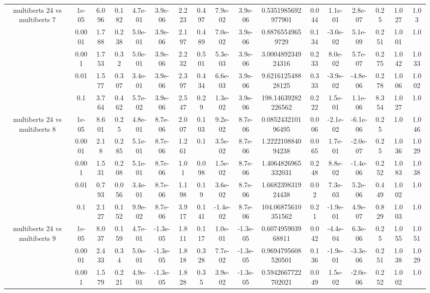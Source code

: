 \begin{tabular}{|c|c|c|c|c|c|c|c|c|c|c|c|c|c|c|c|c|}
\hline
\multirow{5}{*}{multiberts 24 vs multiberts 7} & 1e-05 & 6.096 & 0.182 & 4.7e-01 & 3.9e-06 & 2.223 & 0.497 & 7.9e-02 & 3.9e-06 & 0.5351985692977901 & 0.044 & 1.1e-01 & 2.8e-07 & 0.25 & 1.027 & 1.03 \\
 & 0.0001 & 1.788 & 0.238 & 5.0e-01 & 3.9e-06 & 2.197 & 0.489 & 7.0e-02 & 3.9e-06 & 0.88765549659729 & 0.134 & -3.0e-02 & 5.1e-09 & 0.251 & 1.001 & 1.0 \\
 & 0.001 & 1.753 & 0.32 & 5.0e-01 & 3.9e-06 & 2.232 & 0.501 & 5.3e-03 & 3.9e-06 & 3.000489234924316 & 0.233 & 8.0e-02 & 5.7e-07 & 0.275 & 1.042 & 1.033 \\
 & 0.01 & 1.577 & 0.307 & 3.4e-01 & 3.9e-06 & 2.397 & 0.434 & 6.6e-03 & 3.9e-06 & 9.621612548828125 & 0.333 & -3.9e-02 & -4.8e-06 & 0.278 & 1.006 & 1.002 \\
 & 0.1 & 3.764 & 0.462 & 5.7e-02 & 3.9e-06 & 2.547 & 0.29 & 1.3e-02 & 3.9e-06 & 198.14639282226562 & 0.222 & 1.5e-01 & 1.1e-06 & 8.354 & 1.027 & 1.0 \\
\hline
\multirow{5}{*}{multiberts 24 vs multiberts 8} & 1e-05 & 8.601 & 0.25 & 4.8e-01 & 8.7e-06 & 2.007 & 0.103 & 9.2e-02 & 8.7e-06 & 0.085243210196495 & 0.006 & -2.1e-02 & -6.1e-06 & 0.25 & 1.0 & 1.046 \\
 & 0.0001 & 2.18 & 0.285 & 5.1e-01 & 8.7e-06 & 1.261 & 0.1 & 3.5e-02 & 8.7e-06 & 1.222210884094238 & 0.065 & 1.7e-01 & -2.0e-07 & 0.25 & 1.036 & 1.029 \\
 & 0.001 & 1.531 & 0.208 & 5.1e-01 & 8.7e-06 & 1.01 & 0.098 & 1.5e-02 & 8.7e-06 & 1.4064826965332031 & 0.248 & 8.8e-02 & -1.4e-06 & 0.252 & 1.083 & 1.038 \\
 & 0.01 & 0.793 & 0.056 & 3.4e-01 & 8.7e-06 & 1.198 & 0.19 & 3.6e-02 & 8.7e-06 & 1.668239831924438 & 0.02 & 7.3e-03 & 5.2e-06 & 0.449 & 1.002 & 1.0 \\
 & 0.1 & 2.127 & 0.152 & 9.9e-02 & 8.7e-06 & 3.917 & 0.141 & -1.4e-02 & 8.7e-06 & 104.06875610351562 & 0.21 & -1.9e-01 & 4.9e-07 & 0.829 & 1.003 & 1.0 \\
\hline
\multirow{5}{*}{multiberts 24 vs multiberts 9} & 1e-05 & 8.037 & 0.159 & 4.7e-01 & -1.3e-05 & 1.811 & 0.117 & 1.0e-01 & -1.3e-05 & 0.607495903968811 & 0.042 & -4.4e-04 & 6.3e-06 & 0.25 & 1.055 & 1.051 \\
 & 0.0001 & 2.433 & 0.34 & 5.0e-01 & -1.3e-05 & 1.818 & 0.328 & 7.7e-02 & -1.3e-05 & 0.9694795608520501 & 0.136 & -1.9e-01 & -3.3e-06 & 0.251 & 1.038 & 1.029 \\
 & 0.001 & 1.579 & 0.221 & 4.9e-01 & -1.3e-05 & 1.828 & 0.35 & 3.9e-02 & -1.3e-05 & 0.5942667722702021 & 0.049 & 1.5e-02 & -2.0e-06 & 0.252 & 1.002 & 1.0 \\

\end{tabular}
